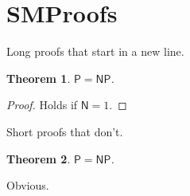 \documentclass[class=scrartcl,crop=false]{standalone}
\newtheorem{theorem}{Theorem}[section]
\begin{document}
\section{SMProofs}

Long proofs that start in a new line.

\begin{theorem}
    $\mathsf{P} = \mathsf{NP}$.
\end{theorem}

\begin{proof}
    Holds if $\mathsf{N} = 1$.
\end{proof}

Short proofs that don't.

\begin{theorem}
    $\mathsf{P} = \mathsf{NP}$.
\end{theorem}

\begin{shortproof}
    Obvious.
\end{shortproof}
\end{document}
